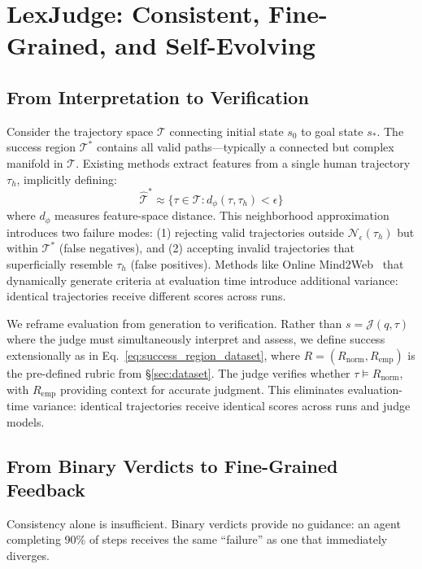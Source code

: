 \section{LexJudge: Consistent, Fine-Grained, and Self-Evolving}
\label{sec:evaluation}



\subsection{From Interpretation to Verification}

Consider the trajectory space $\mathcal{T}$ connecting initial state $s_0$ to goal state $s_*$. The success region $\mathcal{T}^*$ contains all valid paths---typically a connected but complex manifold in $\mathcal{T}$. Existing methods extract features from a single human trajectory $\tau_h$, implicitly defining:
\begin{equation}
\hat{\mathcal{T}}^* \approx \{\tau \in \mathcal{T} : d_\phi(\tau, \tau_h) < \epsilon\}
\label{eq:traj_approx}
\end{equation}
where $d_\phi$ measures feature-space distance. This neighborhood approximation introduces two failure modes: (1) rejecting valid trajectories outside $\mathcal{N}_\epsilon(\tau_h)$ but within $\mathcal{T}^*$ (false negatives), and (2) accepting invalid trajectories that superficially resemble $\tau_h$ (false positives). Methods like Online Mind2Web~\cite{online-mind2web} that dynamically generate criteria at evaluation time introduce additional variance: identical trajectories receive different scores across runs.

We reframe evaluation from generation to verification. Rather than $s = \mathcal{J}(q, \tau)$ where the judge must simultaneously interpret and assess, we define success extensionally as in Eq.~\ref{eq:success_region_dataset}, where $R = (R_{\text{norm}}, R_{\text{emp}})$ is the pre-defined rubric from \S\ref{sec:dataset}. The judge verifies whether $\tau \models R_{\text{norm}}$, with $R_{\text{emp}}$ providing context for accurate judgment. This eliminates evaluation-time variance: identical trajectories receive identical scores across runs and judge models.

\subsection{From Binary Verdicts to Fine-Grained Feedback}

Consistency alone is insufficient. Binary verdicts provide no guidance: an agent completing 90\% of steps receives the same ``failure'' as one that immediately diverges.

